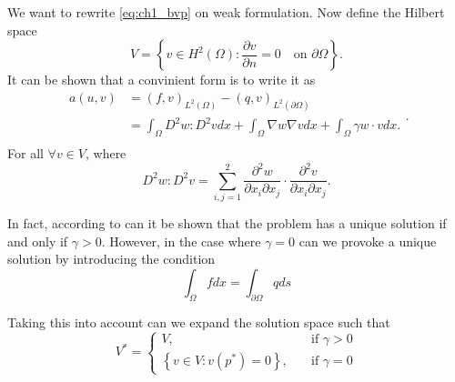 We want to rewrite \eqref{eq:ch1_bvp} on weak formulation. Now define the Hilbert space \[
V = \left\{ v \in H^2\left( \Omega  \right): \frac{\partial v}{\partial  n}  = 0 \quad \text{on } \partial \Omega
\right\}.
\]
It can be shown \cite{gu2012c0} that a convinient form is to write it as
\begin{equation}
\label{eq:weakform}
    \begin{split}
a\left( u,v \right) &=  \left( f,v \right)_{L^2\left( \Omega  \right)}  - \left( q,v \right)_{L^2\left( \partial \Omega  \right)}  \\
& = \int_{\Omega }^{} D^2 w : D^2 v dx +  \int_{\Omega }^{} \nabla w \nabla v dx + \int_{\Omega }^{} \gamma w \cdot v dx
.\\
    \end{split}
.\end{equation}
For all $\forall v \in  V$, where \[
D^2 w : D^2 v = \sum_{i,j=1}^{2}  \frac{\partial ^2 w}{\partial x_{i} \partial x_{j} } \cdot  \frac{\partial ^2 v
}{\partial x_{i} \partial x_{j} }.
\]


In fact, according to \cite{gu2012c0} can it be shown that the problem has a unique solution if and only if $\gamma >
0$. However, in the case where $\gamma  = 0$ can we provoke a unique solution by introducing the condition \[
\int_{\Omega }^{} f dx = \int_{\partial \Omega }^{}  q ds
\]

Taking this into account can we expand the solution space such that \[
V^* = \begin{cases}
    V, \quad & \text{if } \gamma >0 \\
    \left\{ v \in V: v\left( p^* \right) = 0 \right\}, \quad & \text{if } \gamma  =0
\end{cases}
\]

